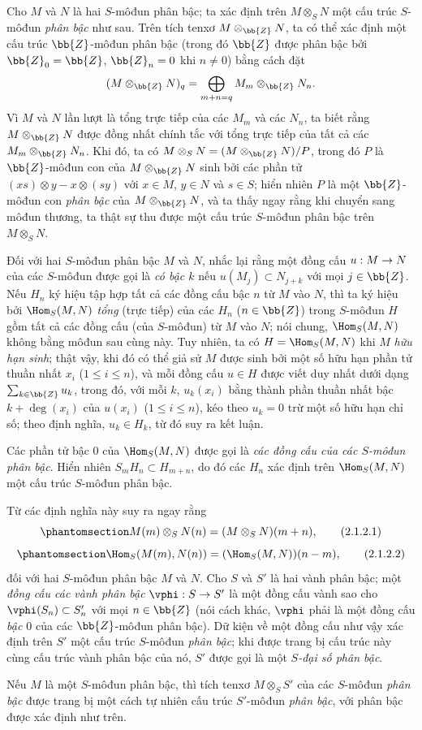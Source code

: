 \documentclass[oneside,10pt]{amsart}
\makeatletter
\renewcommand{\leq}{\leqslant}
\newcommand{\ega@arrow}[2]{\mathchoice{#1}{#2}{#2}{#2}}
\renewcommand{\to}{\ega@arrow{\longrightarrow}{\rightarrow}}
\newcommand{\oldpage}[2][]{\marginnote{\normalfont\footnotesize\textbf{#1}~|~#2}\ignorespaces}
\let\EGAOriginalLabel\label
\renewcommand{\label}[1]{\phantomsection\EGAOriginalLabel{#1}}
\makeatother
\begin{document}
\begin{env}[2.1.2]
\label{II.2.1.2}
Cho $M$ và $N$ là hai $S$-môđun phân bậc; ta xác định trên $M\otimes_S N$ một cấu trúc $S$-môđun \emph{phân bậc} như sau.
Trên tích tenxơ $M\otimes_\bb{Z}N$, ta có thể xác định một cấu trúc $\bb{Z}$-môđun phân bậc (trong đó $\bb{Z}$ được phân bậc bởi $\bb{Z}_0=\bb{Z}$, $\bb{Z}_n=0$ khi $n\neq0$) bằng cách đặt
\[
  (M\otimes_\bb{Z}N)_q
  =\bigoplus_{m+n=q}M_m\otimes_\bb{Z}N_n.
\]
Vì $M$ và $N$ lần lượt là tổng trực tiếp của các $M_m$ và các $N_n$, ta biết rằng $M\otimes_\bb{Z}N$ được đồng nhất chính tắc với tổng trực tiếp của tất cả các $M_m\otimes_\bb{Z}N_n$.
Khi đó, ta có $M\otimes_S N=(M\otimes_\bb{Z}N)/P$, trong đó $P$ là $\bb{Z}$-môđun con của $M\otimes_\bb{Z}N$ sinh bởi các phần tử $(xs)\otimes y-x\otimes(sy)$ với $x\in M$, $y\in N$ và $s\in S$; hiển nhiên $P$ là một $\bb{Z}$-môđun con \emph{phân bậc} của $M\otimes_\bb{Z}N$, và ta thấy ngay rằng khi chuyển sang môđun thương, ta thật sự thu được một cấu trúc $S$-môđun phân bậc trên $M\otimes_S N$.

Đối với hai $S$-môđun phân bậc $M$ và $N$, nhắc lại rằng một đồng cấu $u:M\to N$ của các $S$-môđun được gọi là \emph{có bậc $k$} nếu $u(M_j)\subset N_{j+k}$ với mọi $j\in\bb{Z}$.
Nếu $H_n$ ký hiệu tập hợp tất cả các đồng cấu bậc $n$ từ $M$ vào $N$, thì ta ký hiệu bởi $\Hom_S(M,N)$ \emph{tổng} (trực tiếp) của các $H_n$ ($n\in\bb{Z}$) trong $S$-môđun $H$ gồm tất cả các đồng cấu (của $S$-môđun) từ $M$ vào $N$; nói chung, $\Hom_S(M,N)$ không bằng môđun sau cùng này.
Tuy nhiên, ta có $H=\Hom_S(M,N)$ khi $M$ \emph{hữu hạn sinh}; thật vậy, khi đó có thể giả sử $M$ được sinh bởi một số hữu hạn phần tử thuần nhất $x_i$ ($1\leq i\leq n$), và mỗi đồng cấu $u\in H$ được viết duy nhất dưới dạng $\sum_{k\in\bb{Z}}u_k$, trong đó, với mỗi $k$, $u_k(x_i)$ bằng thành phần thuần nhất bậc $k+\deg(x_i)$ của $u(x_i)$ ($1\leq i\leq n$), kéo theo $u_k=0$ trừ một số hữu hạn chỉ số; theo định nghĩa, $u_k\in H_k$, từ đó suy ra kết luận.

Các phần tử bậc $0$ của $\Hom_S(M,N)$ được gọi là \emph{các đồng cấu của các $S$-môđun phân bậc}.
Hiển nhiên $S_mH_n\subset H_{m+n}$, do đó các $H_n$ xác định trên $\Hom_S(M,N)$ một cấu trúc $S$-môđun phân bậc.

Từ các định nghĩa này suy ra ngay rằng
\[
\label{II.2.1.2.1}
  M(m)\otimes_S N(n)=(M\otimes_S N)(m+n),
\tag{2.1.2.1}
\]
\[
\label{II.2.1.2.2}
  \Hom_S(M(m),N(n))=(\Hom_S(M,N))(n-m),
\tag{2.1.2.2}
\]
đối với hai $S$-môđun phân bậc $M$ và $N$.
\oldpage[II]{21}
Cho $S$ và $S'$ là hai vành phân bậc; một \emph{đồng cấu các vành phân bậc} $\vphi:S\to S'$ là một đồng cấu vành sao cho $\vphi(S_n)\subset S_n'$ với mọi $n\in\bb{Z}$ (nói cách khác, $\vphi$ phải là một đồng cấu \emph{bậc $0$} của các $\bb{Z}$-môđun phân bậc).
Dữ kiện về một đồng cấu như vậy xác định trên $S'$ một cấu trúc $S$-môđun \emph{phân bậc}; khi được trang bị cấu trúc này cùng cấu trúc vành phân bậc của nó, $S'$ được gọi là một \emph{$S$-đại số phân bậc}.

Nếu $M$ là một $S$-môđun phân bậc, thì tích tenxơ $M\otimes_S S'$ của các $S$-môđun \emph{phân bậc} được trang bị một cách tự nhiên cấu trúc $S'$-môđun \emph{phân bậc}, với phân bậc được xác định như trên.
\end{env}
\end{document}
